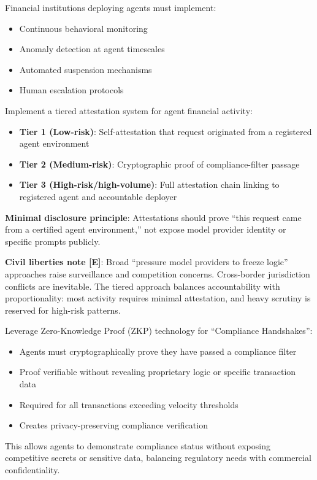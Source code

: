 \documentclass[11pt,letterpaper]{article}
\begin{document}
\begin{recbox}
Financial institutions deploying agents must implement:
\begin{itemize}
  \item Continuous behavioral monitoring
  \item Anomaly detection at agent timescales
  \item Automated suspension mechanisms
  \item Human escalation protocols
\end{itemize}
\end{recbox}

\begin{recbox}
Implement a tiered attestation system for agent financial activity:
\begin{itemize}
  \item \textbf{Tier 1 (Low-risk)}: Self-attestation that request originated from a registered agent environment
  \item \textbf{Tier 2 (Medium-risk)}: Cryptographic proof of compliance-filter passage
  \item \textbf{Tier 3 (High-risk/high-volume)}: Full attestation chain linking to registered agent and accountable deployer
\end{itemize}

\textbf{Minimal disclosure principle}: Attestations should prove ``this request came from a certified agent environment,'' not expose model provider identity or specific prompts publicly.

\textbf{Civil liberties note [E]}: Broad ``pressure model providers to freeze logic'' approaches raise surveillance and competition concerns. Cross-border jurisdiction conflicts are inevitable. The tiered approach balances accountability with proportionality: most activity requires minimal attestation, and heavy scrutiny is reserved for high-risk patterns.
\end{recbox}

\begin{recbox}
Leverage Zero-Knowledge Proof (ZKP) technology for ``Compliance Handshakes'':
\begin{itemize}
  \item Agents must cryptographically prove they have passed a compliance filter
  \item Proof verifiable without revealing proprietary logic or specific transaction data
  \item Required for all transactions exceeding velocity thresholds
  \item Creates privacy-preserving compliance verification
\end{itemize}

This allows agents to demonstrate compliance status without exposing competitive secrets or sensitive data, balancing regulatory needs with commercial confidentiality.
\end{recbox}
\end{document}
